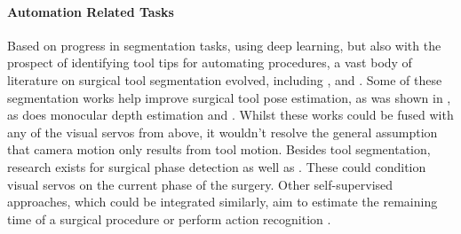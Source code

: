 \paragraph{Automation Related Tasks} Based on progress in segmentation tasks, using deep learning, but also with the prospect of identifying tool tips for automating procedures, a vast body of literature on surgical tool segmentation evolved, including \cite{allan20192017, pakhomov2019deep}, and \cite{garcia2016real, garcia2017toolnet, shvets2018automatic, islam2019real, jin2018tool, sarikaya2017detection, da2019self, attia2017surgical, laina2017concurrent}. Some of these segmentation works help improve surgical tool pose estimation, as was shown in \cite{kurmann2017simultaneous, li2020super, hasan2021detection}, as does monocular depth estimation \cite{li2020unsupervised,huang2021self,xu2022self,li2023multi} and \cite{li2022geometric,bardozzo2022stasis,huang2022simultaneous,huang2022self}. Whilst these works could be fused with any of the visual servos from above, it wouldn't resolve the general assumption that camera motion only results from tool motion. Besides tool segmentation, research exists for surgical phase detection \cite{stauder2014random, lalys2014surgical, jin2016endorcn, dergachyova2016automatic,twinanda2016endonet,malpani2016system, jin2017sv, ross2018exploiting, yengera2018less, funke2018temporal, yu2018learning} as well as \cite{bodenstedt2019active, padoy2019machine, czempiel2020tecno, jin2020multi, kitaguchi2020real}. These could condition visual servos on the current phase of the surgery. Other self-supervised approaches, which could be integrated similarly, aim to estimate the remaining time of a surgical procedure \cite{twinanda2018rsdnet, bodenstedt2019prediction, rivoir2019unsupervised} or perform action recognition \cite{nwoye2021deep}.


